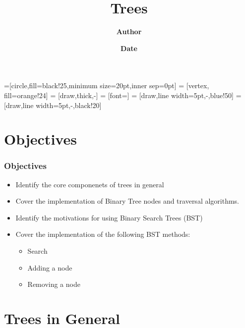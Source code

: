 \documentclass{beamer}
\title{\textbf{Trees}}
\author{\textbf{Author}}
\institute[\textbf{UIUC}]{\textbf{University of Illinois Urbana-Champaign}}
\date{\textbf{Date}}
\begin{document}

=[circle,fill=black!25,minimum size=20pt,inner sep=0pt]
 = [vertex, fill=orange!24]
 = [draw,thick,-]
 = [font=\small]
 = [draw,line width=5pt,-,blue!50]
 = [draw,line width=5pt,-,black!20]


\frame{\titlepage}

\section{Objectives}
\begin{frame}
	\frametitle{Objectives}
    \centering
    \begin{itemize}
		\item Identify the core componenets of trees in general
		\item Cover the implementation of Binary Tree nodes and traversal algorithms.
		\item Identify the motivations for using Binary Search Trees (BST)
		\item Cover the implementation of the following BST methods:
		\begin{itemize}
			\item Search
			\item Adding a node
			\item Removing a node
		\end{itemize}
    \end{itemize}
\end{frame}


\section{Trees in General}
\end{document}
